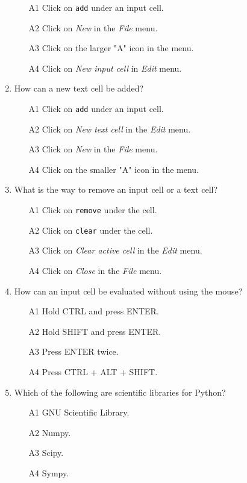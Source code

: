 \documentclass[article,A4,12pt]{llncs}
\begin{document}
\begin{enumerate}
\begin{enumerate}
\item[A1] Click on {\tt add} under an input cell. 
\item[A2] Click on {\em New} in the {\em File} menu.
\item[A3] Click on the larger "A" icon in the menu.
\item[A4] Click on {\em New input cell} in {\em Edit} menu.
\end{enumerate}
\item How can a new text cell be added?
\begin{enumerate}
\item[A1] Click on {\tt add} under an input cell. 
\item[A2] Click on {\em New text cell} in the {\em Edit} menu.
\item[A3] Click on {\em New} in the {\em File} menu.
\item[A4] Click on the smaller "A" icon in the menu.
\end{enumerate}
\item What is the way to remove an input cell or a text cell?
\begin{enumerate}
\item[A1] Click on {\tt remove} under the cell. 
\item[A2] Click on {\tt clear} under the cell. 
\item[A3] Click on {\em Clear active cell} in the {\em Edit} menu.
\item[A4] Click on {\em Close} in the {\em File} menu.
\end{enumerate}
\item How can an input cell be evaluated without using the mouse?
\begin{enumerate}
\item[A1] Hold CTRL and press ENTER.
\item[A2] Hold SHIFT and press ENTER.
\item[A3] Press ENTER twice.
\item[A4] Press CTRL + ALT + SHIFT.
\end{enumerate}
\item Which of the following are scientific libraries for Python?
\begin{enumerate}
\item[A1] GNU Scientific Library.
\item[A2] Numpy.
\item[A3] Scipy.
\item[A4] Sympy.
\end{enumerate}
\end{enumerate}
\end{document}
